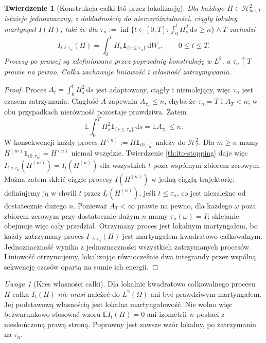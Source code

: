 \documentclass[11pt,a4paper,oneside]{report}
\numberwithin{equation}{chapter}
\theoremstyle{plain}
\newtheorem{twierdzenie}{Twierdzenie}[chapter]
\theoremstyle{definition}
\theoremstyle{remark}
\newtheorem{uwaga}{Uwaga}[chapter]
\newcommand{\E}{\mathbb{E}}
\newcommand{\calH}{\mathcal{H}}
\newcommand{\ind}[1]{\mathbf{1}_{#1}}
\newcommand{\dd}{\mathrm{d}}
\begin{document}
\begin{twierdzenie}[Konstrukcja całki Itô przez lokalizację]\label{thm:volIII:02:06}\label{th:ito-local}
Dla każdego $H\in\calH_{\mathrm{loc},T}^2$
istnieje jednoznaczny, z dokładnością do nierozróżnialności,
ciągły lokalny martyngał $I(H)$, taki że dla
$\tau_n:=\inf\{t\in[0,T]:\int_0^t H_s^2\,\dd s\ge n\}\wedge T$
zachodzi
\[
I_{t\wedge\tau_n}(H)
=\int_0^tH_s\ind{\{s\le\tau_n\}}\,\dd W_s,
\qquad 0\le t\le T.
\tag{2.12}
\]
Procesy po prawej są zdefiniowane przez
poprzednią konstrukcję w $L^2$, a $\tau_n\uparrow T$
prawie na pewno. Całka zachowuje liniowość i własność
zatrzymywania.
\end{twierdzenie}
\begin{proof}
Proces $A_t=\int_0^tH_s^2\,\dd s$ jest adaptowany,
ciągły i niemalejący, więc $\tau_n$ jest czasem
zatrzymania. Ciągłość $A$ zapewnia
$A_{\tau_n}\le n$, chyba że $\tau_n=T$ i $A_T<n$;
w obu przypadkach nierówność pozostaje prawdziwa.
Zatem
\[
\E\int_0^T H_s^2\ind{\{s\le\tau_n\}}\,\dd s
=\E A_{\tau_n}\le n.
\]
W konsekwencji każdy proces
$H^{(n)}:=H\ind{(0,\tau_n]}$ należy do $\calH_T^2$.
Dla $m\ge n$ mamy
$H^{(m)}\ind{(0,\tau_n]}=H^{(n)}$ niemal wszędzie.
Twierdzenie \ref{th:ito-stopping} daje więc
$I_{t\wedge\tau_n}(H^{(m)})=I_t(H^{(n)})$ dla wszystkich
$t$ poza wspólnym zbiorem zerowym.
Można zatem skleić ciągłe procesy $I(H^{(n)})$
w jedną ciągłą trajektorię: definiujemy ją w chwili $t$
przez $I_t(H^{(n)})$, jeśli $t\le\tau_n$, co jest
niezależne od dostatecznie dużego $n$.
Ponieważ $A_T<\infty$ prawie na pewno, dla każdego
$\omega$ poza zbiorem zerowym przy dostatecznie dużym
$n$ mamy $\tau_n(\omega)=T$; sklejanie obejmuje więc
cały przedział. Otrzymany proces jest lokalnym martyngałem,
bo każdy zatrzymany proces $I_{\cdot\wedge\tau_n}(H)$
jest martyngałem kwadratowo całkowalnym.
Jednoznaczność wynika z jednoznaczności wszystkich
zatrzymanych procesów. Liniowość otrzymujemy,
lokalizując równocześnie dwa integrandy przez
wspólną sekwencję czasów opartą na sumie ich energii.
\end{proof}

\begin{uwaga}[Kres własności całki]
Dla lokalnie kwadratowo całkowalnego procesu $H$ całka
$I_t(H)$ \emph{nie musi} należeć do $L^2(\Omega)$ ani
być prawdziwym martyngałem. Jej podstawową własnością
jest lokalna martyngałowość. Nie wolno więc bezwarunkowo
stosować wzoru $\E I_t(H)=0$ ani izometrii w postaci
z nieskończoną prawą stroną. Poprawny jest zawsze
wzór lokalny, po zatrzymaniu na $\tau_n$.
\end{uwaga}
\end{document}
